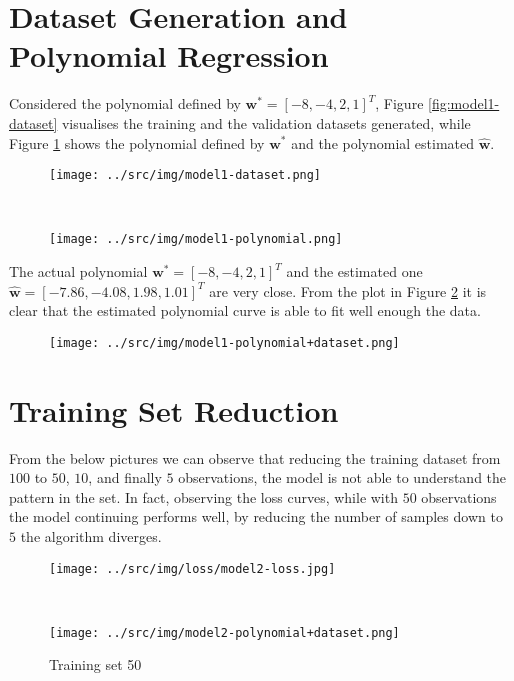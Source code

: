\documentclass[a4paper,12pt]{article} %
\begin{document}
	\section{Dataset Generation and Polynomial Regression} 
	Considered the polynomial defined by $\textbf{w}^*=[-8,-4,2,1]^T$, Figure 
	\ref{fig:model1-dataset} visualises the training and the validation 
	datasets generated, while Figure \ref{fig:model1-polynomial} shows 
	the polynomial defined by $\textbf{w}^*$ and the polynomial estimated 
	$\hat{\textbf{w}}$.
	
	\begin{figure}[H]
		\begin{minipage}[c]{.5\textwidth}
			\centering
			\texttt{[image: ../src/img/model1-dataset.png]}
			\label{fig:model1-dataset}
		\end{minipage}
		~
		\begin{minipage}[c]{.5\textwidth}
			\centering
			\texttt{[image: ../src/img/model1-polynomial.png]}
			\label{fig:model1-polynomial}
		\end{minipage}
	\end{figure}
	
 	The actual polynomial $\textbf{w}^*=[-8,-4,2,1]^T$ and the estimated one 	
 	$\hat{\textbf{w}}=[-7.86,-4.08,1.98,1.01]^T$ are very close.
 	From the plot in Figure \ref{fig:model1-polynomial+dataset} it is clear 
 	that the estimated polynomial curve is able to fit well enough the data.
 	
	\begin{figure}[H]
		\centering
		\texttt{[image: ../src/img/model1-polynomial+dataset.png]}
		\label{fig:model1-polynomial+dataset}
	\end{figure}
	
	\section{Training Set Reduction}
	From the below pictures we can observe that reducing the training dataset 
	from $100$ to $50$, $10$, and finally $5$ observations, the model is not 
	able to understand the pattern in the set. In fact, observing the loss 
	curves, while with $50$ observations the model continuing performs well, by 
	reducing the number of samples down to $5$ the algorithm diverges.
	
	\begin{figure}[H]
		\begin{minipage}[t]{.5\textwidth}
			\centering
			\texttt{[image: ../src/img/loss/model2-loss.jpg]}
			\label{fig:model2-loss}
		\end{minipage}
		~
		\begin{minipage}[t]{.5\textwidth}
			\centering
			\texttt{[image: ../src/img/model2-polynomial+dataset.png]}
			\label{fig:model2-polynomial+dataset}
		\end{minipage}
	\caption{Training set 50}
	\end{figure}
	
\end{document}
